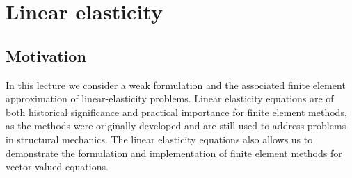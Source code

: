 \chapter{Linear elasticity}

\disclaimer

\section{Motivation}
In this lecture we consider a weak formulation and the associated finite element approximation of linear-elasticity problems.  Linear elasticity equations are of both historical significance and practical importance for finite element methods, as the methods were originally developed and are still used to address problems in structural mechanics.  The linear elasticity equations also allows us to demonstrate the formulation and implementation of finite element methods for vector-valued equations.


